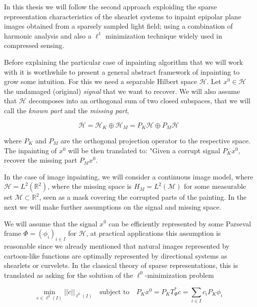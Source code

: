 \bigskip

In this thesis we will follow the second approach exploiding the sparse representation characteristics of the shearlet systems to inpaint epipolar plane images obtained from a sparsely sampled light field; using a combination of harmonic analysis and also a $\ell^1$ minimization technique widely used in compressed sensing. 

\bigskip

Before explaining the particular case of inpainting algorithm that we will work with it is worthwhile to present a general abstract framework of inpainting to grow some intuition. For this we need a separable Hilbert space $\mathcal{H}$. Let $x^0\in\mathcal{H}$ the undamaged (original) \textit{signal} that we want to recover. We will also assume that $\mathcal{H}$ decomposes into an orthogonal sum of two closed subspaces, that we will call the \textit{known part} and the \textit{missing part}, 

$$
\mathcal{H}=\mathcal{H}_K\oplus\mathcal{H}_M=P_K\mathcal{H}\oplus P_M\mathcal{H}
$$

where $P_K$ and $P_M$ are the orthogonal projection operator to the respective space. The inpainting of $x^0$ will be then translated to: "Given a corrupt signal $P_Kx^0$, recover the missing part $P_Mx^0$. 

\bigskip

In the case of image inpainting, we will consider a continuous image model, where $\mathcal{H}=L^2(\mathbb{R}^2)$, where the missing space is $H_M=L^2(\mathcal{M})$ for some measurable set $\mathcal{M}\subset\mathbb{R}^2$, seen as a mask covering the corrupted parts of the painting. In the next we will make further assumptions on the signal and missing space.

\bigskip

We will assume that the signal $x^0$ can be efficiently represented by some Parseval frame $\Phi=(\phi_i)_{i\in I}$ for $\mathcal{H}$, at practical applications this assumption is reasonable since we already mentioned that natural images represented by cartoon-like functions are optimally represented by directional systems as shearlets or curvelets. In the classical theory of sparse representations, this is translated as asking for the solution of the $\ell^0$-minimization problem

\begin{equation}
\label{eq:alpha21}
\underset{c\in\ell^2(I)}{\min}||c||_{\ell^0(I)}\quad\textrm{subject to}\quad P_Kx^0=P_KT_{\Phi}^*c=\sum_{i\in I}c_iP_K\phi_i
\end{equation}

